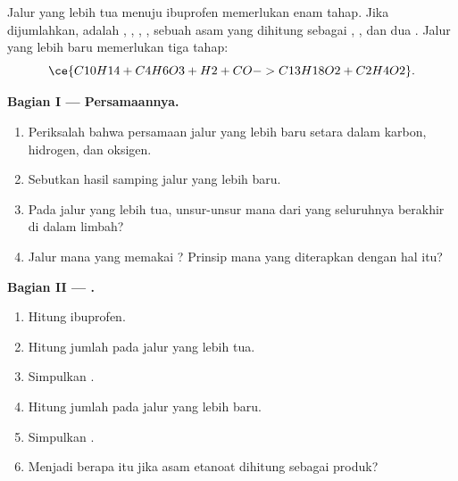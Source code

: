 \begin{problem}
\label{pb:g12:synthesis-strategy:1}
Jalur yang lebih tua menuju ibuprofen  memerlukan enam
tahap. Jika dijumlahkan,  adalah , ,
, , sebuah asam yang dihitung sebagai
, , dan dua . Jalur yang lebih baru memerlukan
tiga tahap:
\[
  \ce{C10H14 + C4H6O3 + H2 + CO -> C13H18O2 + C2H4O2} .
\]

\medskip
\noindent\textbf{Bagian I --- Persamaannya.}
\begin{enumerate}
  \item Periksalah bahwa persamaan jalur yang lebih baru setara dalam
        karbon, hidrogen, dan oksigen.
  \item Sebutkan hasil samping jalur yang lebih baru.
  \item Pada jalur yang lebih tua, unsur-unsur mana dari  yang
        seluruhnya berakhir di dalam limbah?
  \item Jalur mana yang memakai ? Prinsip mana yang diterapkan
        dengan hal itu?
\end{enumerate}

\medskip
\noindent\textbf{Bagian II --- .}
\begin{enumerate}[resume]
  \item Hitung  ibuprofen.
  \item Hitung jumlah   pada jalur yang lebih tua.
  \item Simpulkan .
  \item Hitung jumlah   pada jalur yang lebih baru.
  \item Simpulkan .
  \item Menjadi berapa  itu jika asam etanoat dihitung
        sebagai produk?
\end{enumerate}


\end{problem}

